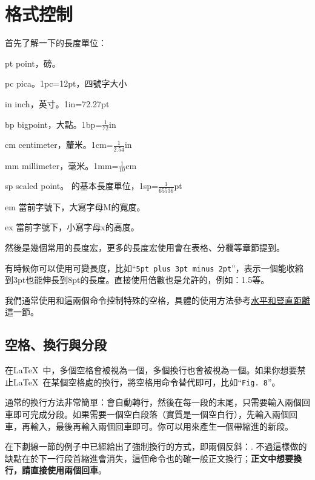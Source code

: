 \section{格式控制}
首先了解一下的長度單位：
\begin{fead}
  \item[pt] point，磅。\label{sec:length}
  \item[pc] pica。1pc=12pt，四號字大小
  \item[in] inch，英寸。1in=72.27pt
  \item[bp] bigpoint，大點。1bp=$\frac{1}{72}$in
  \item[cm] centimeter，釐米。1cm=$\frac{1}{2.54}$in
  \item[mm] millimeter，毫米。1mm=$\frac{1}{10}$cm
  \item[sp] scaled point。 的基本長度單位，1sp=$\frac{1}{65536}$pt
  \item[em] 當前字號下，大寫字母M的寬度。
  \item[ex] 當前字號下，小寫字母x的高度。
\end{fead}

然後是幾個常用的長度宏，更多的長度宏使用會在表格、分欄等章節提到。
\begin{latex}
\textwidth %
\linewidth %
\end{latex}

有時候你可以使用可變長度，比如“\texttt{5pt plus 3pt minus 2pt}”，表示一個能收縮到3pt也能伸長到8pt的長度。直接使用倍數也是允許的，例如：1.5等。

我們通常使用和這兩個命令控制特殊的空格，具體的使用方法參考\hyperref[sec:hvspace]{水平和豎直距離}這一節。

\subsection{空格、換行與分段}
在\LaTeX\ 中，多個空格會被視為一個，多個換行也會被視為一個。如果你想要禁止\LaTeX\ 在某個空格處的換行，將空格用\texttt{}命令替代即可，比如“\texttt{Fig. 8}”。

通常的換行方法非常簡單：會自動轉行，然後在每一段的末尾，只需要輸入兩個回車即可完成分段。如果需要一個空白段落（實質是一個空白行），先輸入兩個回車，再輸入，最後再輸入兩個回車即可。你可以用來產生一個帶縮進的新段。

在下劃線一節的例子中已經給出了強制換行的方式，即兩個反斜：. 不過這樣做的缺點在於下一行段首縮進會消失，這個命令也的確一般正文換行；\textbf{正文中想要換行，請直接使用兩個回車}。

